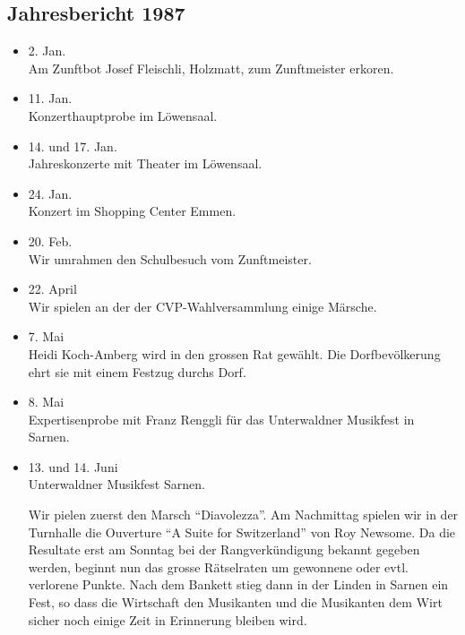 \subsection{Jahresbericht 1987}

\begin{history}


    \begin{itemize}

        \item[]2. Jan.\\
        Am Zunftbot Josef Fleischli, Holzmatt, zum Zunftmeister erkoren.

        \item[]11. Jan.\\
        Konzerthauptprobe im Löwensaal.

        \item[]14. und 17. Jan.\\
        Jahreskonzerte mit Theater im Löwensaal.

        \item[]24. Jan.\\
        Konzert im Shopping Center Emmen.

        \item[]20. Feb.\\
        Wir umrahmen den Schulbesuch vom Zunftmeister.

        \item[]22. April\\
        Wir spielen an der der CVP-Wahlversammlung einige Märsche.

        \item[]7. Mai\\
        Heidi Koch-Amberg wird in den grossen Rat gewählt. Die Dorfbevölkerung
        ehrt sie mit einem Festzug durchs Dorf.

        \item[]8. Mai\\
        Expertisenprobe mit Franz Renggli für das Unterwaldner Musikfest in
        Sarnen.

        \item[]13. und 14. Juni\\
        Unterwaldner Musikfest Sarnen.

        Wir pielen zuerst den Marsch
        \enquote{Diavolezza}. Am Nachmittag spielen wir in der Turnhalle die
        Ouverture \enquote{A Suite for Switzerland} von Roy Newsome. Da die
        Resultate erst am Sonntag bei der Rangverkündigung bekannt gegeben
        werden, beginnt nun das grosse Rätselraten um gewonnene oder evtl.
        verlorene Punkte. Nach dem Bankett stieg dann in der Linden in Sarnen
        ein Fest, so dass die Wirtschaft den Musikanten und die Musikanten dem
        Wirt sicher noch einige Zeit in Erinnerung bleiben wird.


\end{itemize}
\end{history}
